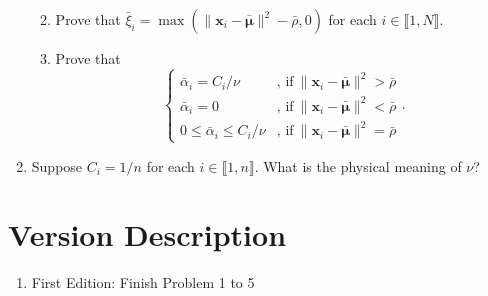 \documentclass{article}
\def\vecx{{\mathbf x}}
\def\vecmu{{\boldsymbol \mu}}
\begin{document}
\begin{enumerate}
\begin{enumerate}
\begin{footnotesize}
\begin{equation}
\end{equation}
\end{footnotesize}
%
\item  Prove that ${\bar \xi}_i = \max\left(\|\vecx_i-{\bar \vecmu}\|^2 - {\bar \rho},0\right)$ for each $i \in \llbracket 1,N\rrbracket$.
\item Prove that
\begin{equation*}
\left\{\begin{array}{ll}
{\bar \alpha}_i = C_i/\nu 			& \mbox{, if}~ \|\vecx_i-{\bar \vecmu}\|^2 > {\bar \rho}\\
{\bar \alpha}_i = 0				& \mbox{, if}~ \|\vecx_i-{\bar \vecmu}\|^2 < {\bar \rho}\\
0 \leq {\bar \alpha}_i \leq C_i/\nu 	& \mbox{, if}~ \|\vecx_i-{\bar \vecmu}\|^2 = {\bar \rho}
\end{array}\right..
\end{equation*}
\end{enumerate}
%
\item Suppose $C_i = 1/n$ for each $i \in \llbracket 1,n \rrbracket$. What is the physical meaning of $\nu$?
\end{enumerate}

 \section*{Version Description}
 \begin{enumerate}
     \item First Edition: Finish Problem 1 to 5
 \end{enumerate}
\end{document}
